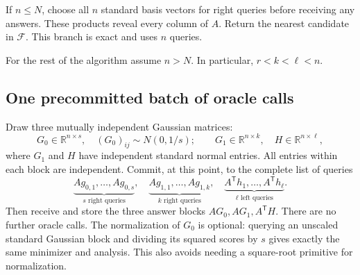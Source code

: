 \documentclass[11pt]{article}
\numberwithin{equation}{section}
\theoremstyle{remark}
\newcommand{\R}{\mathbb R}
\newcommand{\F}{\mathcal F}
\newcommand{\T}{\mathsf T}
\begin{document}
If $n\le N$, choose all $n$ standard basis vectors for right queries before receiving any answers. These products reveal every column of $A$. Return the nearest candidate in $\F$. This branch is exact and uses $n$ queries.

For the rest of the algorithm assume $n>N$. In particular, $r<k<\ell<n$.

\subsection{One precommitted batch of oracle calls}
Draw three mutually independent Gaussian matrices:
\begin{equation}\label{eq:sketchblocks}
 G_0\in\R^{n\times s},\quad (G_0)_{ij}\sim N(0,1/s);
 \qquad G_1\in\R^{n\times k},\quad H\in\R^{n\times\ell},
\end{equation}
where $G_1$ and $H$ have independent standard normal entries. All entries within each block are independent.
Commit, at this point, to the complete list of queries
\begin{equation}\label{eq:queryschedule}
 \underbrace{Ag_{0,1},\ldots,Ag_{0,s}}_{s\text{ right queries}},\quad
 \underbrace{Ag_{1,1},\ldots,Ag_{1,k}}_{k\text{ right queries}},\quad
 \underbrace{A^\T h_1,\ldots,A^\T h_\ell}_{\ell\text{ left queries}}.
\end{equation}
Then receive and store the three answer blocks $AG_0,AG_1,A^\T H$.
There are no further oracle calls.
The normalization of $G_0$ is optional: querying an unscaled standard Gaussian block and dividing its squared scores by $s$ gives exactly the same minimizer and analysis. This also avoids needing a square-root primitive for normalization.
\end{document}
